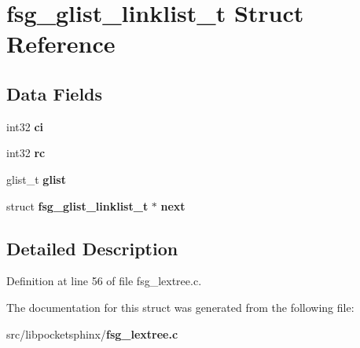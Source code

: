 \section{fsg\-\_\-glist\-\_\-linklist\-\_\-t Struct Reference}
\label{structfsg__glist__linklist__t}
\subsection*{Data Fields}
\begin{DoxyCompactItemize}
\item 
int32 {\bfseries ci}\label{structfsg__glist__linklist__t_aee967d5f9700245d9bf02f22d730fe86}

\item 
int32 {\bfseries rc}\label{structfsg__glist__linklist__t_ad5fd289a4223f35f2f87b974cbc6bd81}

\item 
glist\-\_\-t {\bfseries glist}\label{structfsg__glist__linklist__t_a2bc9d5102b5a082d3ece84ac4dca51be}

\item 
struct {\bf fsg\-\_\-glist\-\_\-linklist\-\_\-t} $\ast$ {\bfseries next}\label{structfsg__glist__linklist__t_ae6b27b46998d4c2ee400ef828c3cbe57}

\end{DoxyCompactItemize}


\subsection{Detailed Description}


Definition at line 56 of file fsg\-\_\-lextree.\-c.



The documentation for this struct was generated from the following file\-:\begin{DoxyCompactItemize}
\item 
src/libpocketsphinx/{\bf fsg\-\_\-lextree.\-c}\end{DoxyCompactItemize}
